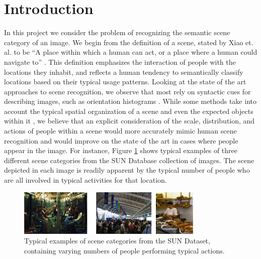 \documentclass[11pt]{article}
\begin{document}
\section{Introduction}
In this project we consider the problem of recognizing the semantic scene category of an image. We begin from the definition of a scene, stated by Xiao et. al. to be ``A place within which a human can act, or a place where a human could navigate to'' \cite{SUN}. This definition emphasizes the interaction of people with the locations they inhabit, and reflects a human tendency to semantically classify locations based on their typical usage patterns. Looking at the state of the art approaches to scene recognition, we observe that most rely on syntactic cues for describing images, such as orientation histograms \cite{gist}. While some methods take into account the typical spatial organization of a scene \cite{beyond_bags} and even the expected objects within it \cite{object_bank}, we believe that an explicit consideration of the scale, distribution, and actions of people within a scene would more accurately mimic human scene recognition and would improve on the state of the art in cases where people appear in the image. For instance, Figure \ref{fig:people} shows typical examples of three different scene categories from the SUN Database collection of images. The scene depicted in each image is readily apparent by the typical number of people who are all involved in typical activities for that location.

\begin{figure}[h]
 \centering
\includegraphics[width=3.5in]{images/people.png}
 \caption{Typical examples of scene categories from the SUN Dataset, containing varying numbers of people performing typical actions.}
 \label{fig:people}
\end{figure}


\end{document}
